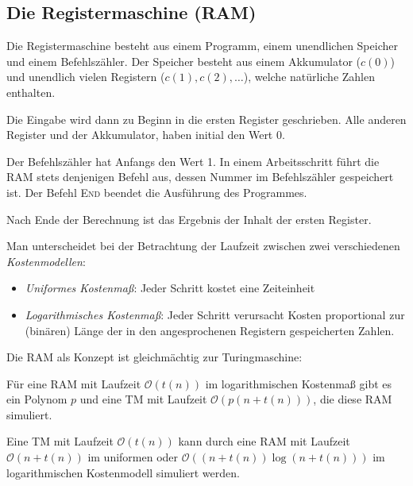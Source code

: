 \documentclass[a4paper,parskip=half*,DIV=7,fontsize=11pt]{scrartcl}
\begin{document}
\subsection{Die Registermaschine (RAM)}
Die Registermaschine besteht aus einem Programm, einem unendlichen Speicher und einem Befehlszähler. Der Speicher besteht aus einem Akkumulator ($c(0)$) und unendlich vielen Registern ($c(1),c(2),\ldots$), welche natürliche Zahlen enthalten.

Die Eingabe wird dann zu Beginn in die ersten Register geschrieben. Alle anderen Register und der Akkumulator, haben initial den Wert $0$.

Der Befehlszähler hat Anfangs den Wert 1. In einem Arbeitsschritt führt die RAM stets denjenigen Befehl aus, dessen Nummer im Befehlszähler gespeichert ist. Der Befehl \textsc{End} beendet die Ausführung des Programmes.

Nach Ende der Berechnung ist das Ergebnis der Inhalt der ersten Register.

Man unterscheidet bei der Betrachtung der Laufzeit zwischen zwei verschiedenen \emph{Kostenmodellen}:
\begin{itemize}
\item \emph{Uniformes Kostenmaß}: Jeder Schritt kostet eine Zeiteinheit
\item \emph{Logarithmisches Kostenmaß}: Jeder Schritt verursacht Kosten proportional zur (binären) Länge der in den  angesprochenen Registern gespeicherten Zahlen.
\end{itemize}

Die RAM als Konzept ist gleichmächtig zur Turingmaschine:

Für eine RAM mit Laufzeit $\mathcal{O}(t(n))$ im logarithmischen Kostenmaß gibt es ein Polynom $p$ und eine TM mit Laufzeit $\mathcal{O}(p(n + t(n)))$, die diese RAM simuliert. 

Eine TM mit Laufzeit $\mathcal{O}(t(n))$ kann durch eine RAM mit Laufzeit $\mathcal{O}(n + t(n))$ im uniformen oder $\mathcal{O}((n + t(n)) \log(n + t(n)))$ im logarithmischen Kostenmodell simuliert werden.
\end{document}
